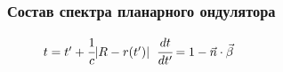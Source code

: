 \documentclass[14pt, hyperref = {colorlinks},xcolor=table ]{beamer}
\begin{document}
\small
\begin{frame}
\frametitle{Состав спектра планарного ондулятора}\label{t1}
\begin{figure}[h]
	\begin{minipage}[h]{0.49\linewidth}
		\vspace{-10pt}
	\end{minipage}	
	\begin{minipage}[h]{0.49\linewidth}
		\vspace{-10pt}
	\end{minipage}
\end{figure}
\vspace{-20pt}
\begin{figure}[h]
	$t = t' + \cfrac{1}{c} |R - r(t')|$ \hspace{40pt}$\cfrac{dt}{dt'} = 1 - \vec{n}\cdot\vec{\beta}$
\end{figure}
\end{frame}
\end{document}
